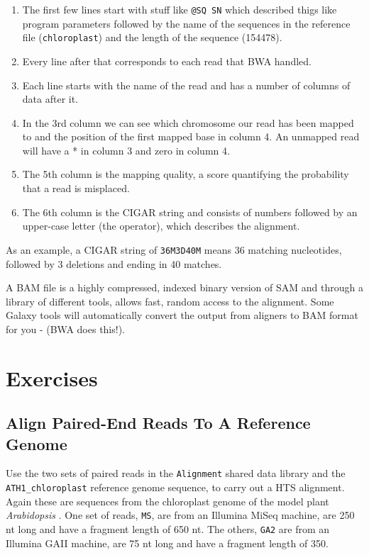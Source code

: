 \documentclass[12pt,]{book}
\providecommand{\tightlist}{%
  \setlength{\itemsep}{0pt}\setlength{\parskip}{0pt}}
\begin{document}
\begin{enumerate}
\def\labelenumi{\arabic{enumi}.}
\tightlist
\item
  The first few lines start with stuff like \texttt{@SQ\ SN} which
  described thigs like program parameters followed by the name of the
  sequences in the reference file (\texttt{chloroplast}) and the length
  of the sequence (154478).
\item
  Every line after that corresponds to each read that BWA handled.
\item
  Each line starts with the name of the read and has a number of columns
  of data after it.
\item
  In the 3rd column we can see which chromosome our read has been mapped
  to and the position of the first mapped base in column 4. An unmapped
  read will have a * in column 3 and zero in column 4.
\item
  The 5th column is the mapping quality, a score quantifying the
  probability that a read is misplaced.
\item
  The 6th column is the CIGAR string and consists of numbers followed by
  an upper-case letter (the operator), which describes the alignment.
\end{enumerate}

As an example, a CIGAR string of \texttt{36M3D40M} means 36 matching
nucleotides, followed by 3 deletions and ending in 40 matches.

A BAM file is a highly compressed, indexed binary version of SAM and
through a library of different tools, allows fast, random access to the
alignment. Some Galaxy tools will automatically convert the output from
aligners to BAM format for you - (BWA does this!).

\section{Exercises}\label{exercises-1}

\subsection{Align Paired-End Reads To A Reference
Genome}\label{align-paired-end-reads-to-a-reference-genome}

Use the two sets of paired reads in the \texttt{Alignment} shared data
library and the \texttt{ATH1\_chloroplast} reference genome sequence, to
carry out a HTS alignment. Again these are sequences from the
chloroplast genome of the model plant \emph{Arabidopsis} . One set of
reads, \texttt{MS}, are from an Illumina MiSeq machine, are 250 nt long
and have a fragment length of 650 nt. The others, \texttt{GA2} are from
an Illumina GAII machine, are 75 nt long and have a fragment length of
350.
\end{document}
